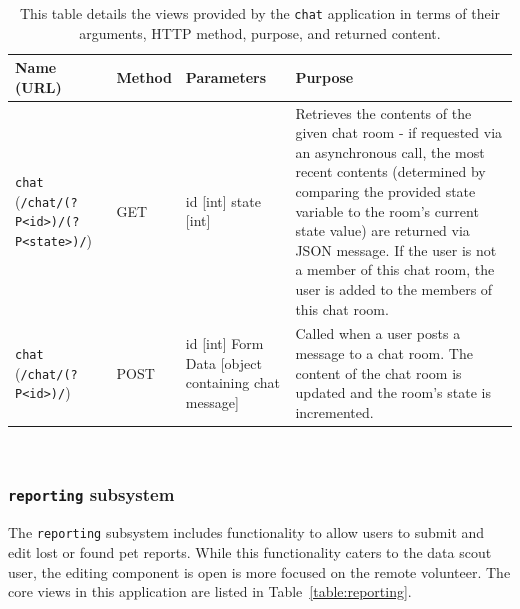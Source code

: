 \begin{table}[htb]
    \caption[Views provided by {\tt chat} subsystem]{
	This table details the views provided by the {\tt chat} application in terms of their arguments, HTTP method, purpose, and returned content.
	}
    \begin{center}
    \begin{tabularx}{ \textwidth}{| p{3cm} | p{1.2cm} | p{4cm} | X | } 
    \hline
    	Name (URL) & Method & Parameters & Purpose \\  \hline \hline

	{\tt chat} \newline ({\tt /chat/(?P<id>)/\newline(?P<state>)/}) & GET & id [int] \newline state [int] & Retrieves the contents of the given chat room - if requested via an asynchronous call, the most recent contents (determined by comparing the provided state variable to the room's current state value) are returned via JSON message.  If the user is not a member of this chat room, the user is added to the members of this chat room.\\ \hline
	{\tt chat} \newline ({\tt /chat/\newline(?P<id>)/}) & POST & id [int] \newline Form Data [object containing chat message] & Called when a user posts a message to a chat room.  The content of the chat room is updated and the room's state is incremented. \\ \hline

	\end{tabularx}
   \\ \rule{0mm}{5mm}
   
	\end{center}
	 \label{table:chat}
\end{table}

\subsubsection {{\tt reporting} subsystem}

The {\tt reporting} subsystem includes functionality to allow users to submit and edit lost or found pet reports.  While this functionality caters to the data scout user, the editing component is open is more focused on the remote volunteer.  The core views in this application are listed in Table~\ref{table:reporting}.


